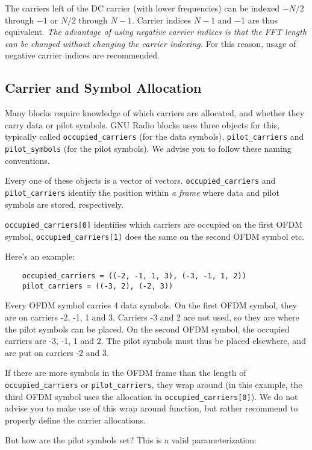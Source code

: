 The carriers left of the DC carrier (with lower frequencies) can be indexed $-N/2$ through $-1$ or $N/2$ through $N-1$. Carrier indices $N-1$ and $-1$ are thus equivalent. \textit{The advantage of using negative carrier indices is that the FFT length can be changed without changing the carrier indexing.} For this reason, usage of negative carrier indices are recommended.

\subsection{Carrier and Symbol Allocation}
Many blocks require knowledge of which carriers are allocated, and whether they carry data or pilot symbols. GNU Radio blocks uses three objects for this, typically called \texttt{occupied\_carriers} (for the data symbols), \texttt{pilot\_carriers} and \texttt{pilot\_symbols} (for the pilot symbols). We advise you to follow these naming conventions.

Every one of these objects is a vector of vectors. \texttt{occupied\_carriers} and \texttt{pilot\_carriers} identify the position within \textit{a frame} where data and pilot symbols are stored, respectively.

\texttt{occupied_carriers[0]} identifies which carriers are occupied on the first OFDM symbol, \texttt{occupied_carriers[1]} does the same on the second OFDM symbol etc.

Here's an example:
\begin{verbatim}
    occupied_carriers = ((-2, -1, 1, 3), (-3, -1, 1, 2))
    pilot_carriers = ((-3, 2), (-2, 3))
\end{verbatim}
Every OFDM symbol carries 4 data symbols. On the first OFDM symbol, they are on carriers -2, -1, 1 and 3. Carriers -3 and 2 are not used, so they are where the pilot symbols can be placed. On the second OFDM symbol, the occupied carriers are -3, -1, 1 and 2. The pilot symbols must thus be placed elsewhere, and are put on carriers -2 and 3.

If there are more symbols in the OFDM frame than the length of \texttt{occupied_carriers} or \texttt{pilot_carriers}, they wrap around (in this example, the third OFDM symbol uses the allocation in \texttt{occupied_carriers[0]}). We do not advise you to make use of this wrap around function, but rather recommend to properly define the carrier allocations.

But how are the pilot symbols set? This is a valid parameterization:

